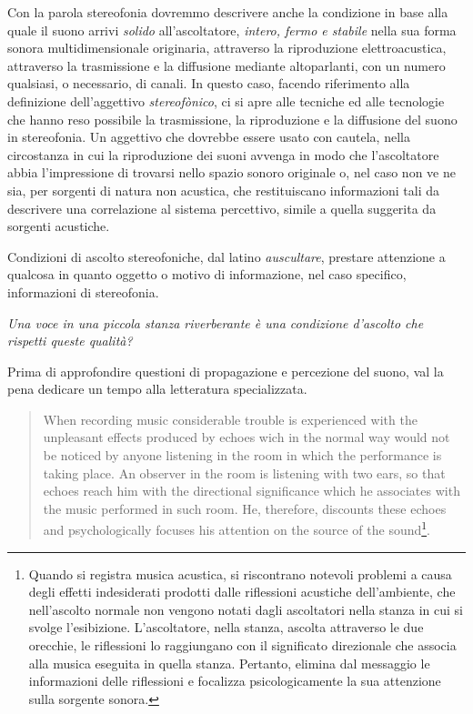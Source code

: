 \documentclass[a4paper,11pt]{article}
\begin{document}
Con la parola stereofonia dovremmo descrivere anche la condizione in
base alla quale il suono arrivi \emph{solido} all'ascoltatore, \emph{intero, fermo
e stabile} nella sua forma sonora multidimensionale originaria,
attraverso la riproduzione elettroacustica, attraverso la trasmissione e
la diffusione mediante altoparlanti, con un numero qualsiasi, o
necessario, di canali. In questo caso, facendo riferimento alla
definizione dell'aggettivo \emph{stereofònico}, ci si apre alle tecniche ed
alle tecnologie che hanno reso possibile la trasmissione, la
riproduzione e la diffusione del suono in stereofonia. Un aggettivo che
dovrebbe essere usato con cautela, nella circostanza in cui la
riproduzione dei suoni avvenga in modo che l'ascoltatore abbia
l'impressione di trovarsi nello spazio sonoro originale o, nel caso non
ve ne sia, per sorgenti di natura non acustica, che restituiscano
informazioni tali da descrivere una correlazione al sistema percettivo,
simile a quella suggerita da sorgenti acustiche.

Condizioni di ascolto stereofoniche, dal latino \emph{auscultare}, prestare
attenzione a qualcosa in quanto oggetto o motivo di informazione, nel
caso specifico, informazioni di stereofonia.

\emph{Una voce in una piccola stanza riverberante è una condizione d'ascolto
che rispetti queste qualità?}

Prima di approfondire questioni di propagazione e percezione del suono,
val la pena dedicare un tempo alla letteratura specializzata.

\begin{quote}
When recording music considerable trouble is experienced with the
unpleasant effects produced by echoes wich in the normal way would not
be noticed by anyone listening in the room in which the performance is
taking place. An observer in the room is listening with two ears, so
that echoes reach him with the directional significance which he
associates with the music performed in such room. He, therefore,
discounts these echoes and psychologically focuses his attention on
the source of the sound\footnote{Quando si registra musica acustica, si riscontrano notevoli
problemi a causa degli effetti indesiderati prodotti dalle
riflessioni acustiche dell'ambiente, che nell'ascolto normale non
vengono notati dagli ascoltatori nella stanza in cui si svolge
l'esibizione. L'ascoltatore, nella stanza, ascolta attraverso le due
orecchie, le riflessioni lo raggiungano con il significato
direzionale che associa alla musica eseguita in quella stanza.
Pertanto, elimina dal messaggio le informazioni delle riflessioni e
focalizza psicologicamente la sua attenzione sulla sorgente sonora.}.
\end{quote}
\end{document}
